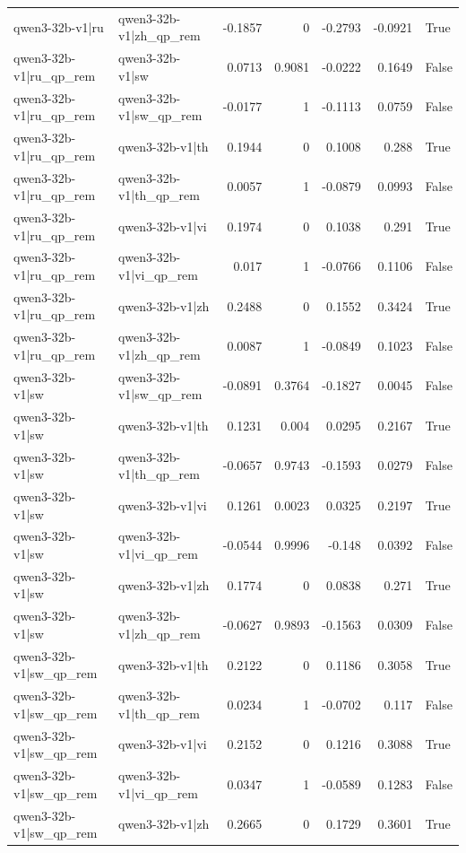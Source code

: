\begin{table}
\begin{tabular}{l l r r r r l}
qwen3-32b-v1|ru & qwen3-32b-v1|zh_qp_rem & -0.1857 & 0 & -0.2793 & -0.0921 & True \\
qwen3-32b-v1|ru_qp_rem & qwen3-32b-v1|sw & 0.0713 & 0.9081 & -0.0222 & 0.1649 & False \\
qwen3-32b-v1|ru_qp_rem & qwen3-32b-v1|sw_qp_rem & -0.0177 & 1 & -0.1113 & 0.0759 & False \\
qwen3-32b-v1|ru_qp_rem & qwen3-32b-v1|th & 0.1944 & 0 & 0.1008 & 0.288 & True \\
qwen3-32b-v1|ru_qp_rem & qwen3-32b-v1|th_qp_rem & 0.0057 & 1 & -0.0879 & 0.0993 & False \\
qwen3-32b-v1|ru_qp_rem & qwen3-32b-v1|vi & 0.1974 & 0 & 0.1038 & 0.291 & True \\
qwen3-32b-v1|ru_qp_rem & qwen3-32b-v1|vi_qp_rem & 0.017 & 1 & -0.0766 & 0.1106 & False \\
qwen3-32b-v1|ru_qp_rem & qwen3-32b-v1|zh & 0.2488 & 0 & 0.1552 & 0.3424 & True \\
qwen3-32b-v1|ru_qp_rem & qwen3-32b-v1|zh_qp_rem & 0.0087 & 1 & -0.0849 & 0.1023 & False \\
qwen3-32b-v1|sw & qwen3-32b-v1|sw_qp_rem & -0.0891 & 0.3764 & -0.1827 & 0.0045 & False \\
qwen3-32b-v1|sw & qwen3-32b-v1|th & 0.1231 & 0.004 & 0.0295 & 0.2167 & True \\
qwen3-32b-v1|sw & qwen3-32b-v1|th_qp_rem & -0.0657 & 0.9743 & -0.1593 & 0.0279 & False \\
qwen3-32b-v1|sw & qwen3-32b-v1|vi & 0.1261 & 0.0023 & 0.0325 & 0.2197 & True \\
qwen3-32b-v1|sw & qwen3-32b-v1|vi_qp_rem & -0.0544 & 0.9996 & -0.148 & 0.0392 & False \\
qwen3-32b-v1|sw & qwen3-32b-v1|zh & 0.1774 & 0 & 0.0838 & 0.271 & True \\
qwen3-32b-v1|sw & qwen3-32b-v1|zh_qp_rem & -0.0627 & 0.9893 & -0.1563 & 0.0309 & False \\
qwen3-32b-v1|sw_qp_rem & qwen3-32b-v1|th & 0.2122 & 0 & 0.1186 & 0.3058 & True \\
qwen3-32b-v1|sw_qp_rem & qwen3-32b-v1|th_qp_rem & 0.0234 & 1 & -0.0702 & 0.117 & False \\
qwen3-32b-v1|sw_qp_rem & qwen3-32b-v1|vi & 0.2152 & 0 & 0.1216 & 0.3088 & True \\
qwen3-32b-v1|sw_qp_rem & qwen3-32b-v1|vi_qp_rem & 0.0347 & 1 & -0.0589 & 0.1283 & False \\
qwen3-32b-v1|sw_qp_rem & qwen3-32b-v1|zh & 0.2665 & 0 & 0.1729 & 0.3601 & True \\

\end{tabular}
\end{table}
